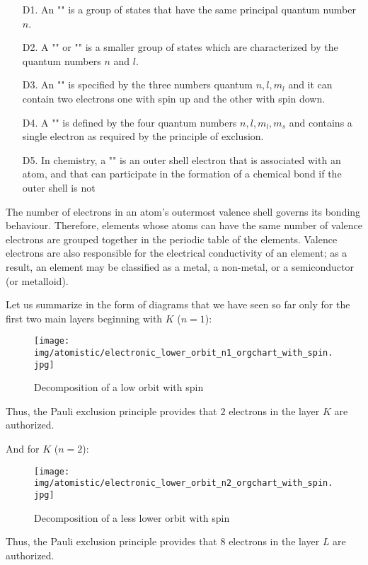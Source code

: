 	 \begin{enumerate}
		\item[D1.] An "" is a group of states that have the same principal quantum number $n$.

		\item[D2.] A "" or "" is a smaller group of states which are characterized by the quantum numbers $n$ and $l$.

		\item[D3.] An "" is specified by the three numbers quantum $n,l,m_l$ and it can contain two electrons one with spin up and the other with spin down.

		\item[D4.] A "" is defined by the four quantum numbers $n,l,m_l,m_s$ and contains a single electron as required by the principle of exclusion.
		
		\item[D5.] In chemistry, a "" is an outer shell electron that is associated with an atom, and that can participate in the formation of a chemical bond if the outer shell is not 
	\end{enumerate}
	The number of electrons in an atom's outermost valence shell governs its bonding behaviour. Therefore, elements whose atoms can have the same number of valence electrons are grouped together in the periodic table of the elements. Valence electrons are also responsible for the electrical conductivity of an element; as a result, an element may be classified as a metal, a non-metal, or a semiconductor (or metalloid).
	
	Let us summarize in the form of diagrams that we have seen so far only for the first two main layers beginning with $K$ ($n=1$):
	\begin{figure}[H]
		\centering
		\texttt{[image: img/atomistic/electronic\_lower\_orbit\_n1\_orgchart\_with\_spin.jpg]}
		\caption{Decomposition of a low orbit with spin}
	\end{figure}
	Thus, the Pauli exclusion principle provides that  $2$ electrons in the layer $K$ are authorized.

	And for $K$ ($n=2$):
	\begin{figure}[H]
		\centering
		\texttt{[image: img/atomistic/electronic\_lower\_orbit\_n2\_orgchart\_with\_spin.jpg]}
		\caption{Decomposition of a less lower orbit with spin}
	\end{figure}
	Thus, the Pauli exclusion principle provides that  $8$ electrons in the layer $L$ are authorized.
	
